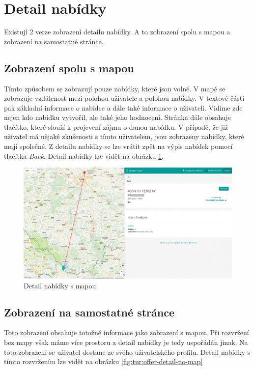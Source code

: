 \section{Detail nabídky}

\label{nur:detail}

Existují 2 verze zobrazení detailu nabídky. A to zobrazení spolu s mapou a zobrazení na samostatné stránce.

\subsection{Zobrazení spolu s mapou}
Tímto způsobem se zobrazují pouze nabídky, které jsou volné. V mapě se zobrazuje vzdálenost mezi polohou uživatele a polohou nabídky. V textové části pak základní informace o nabídce a dále také informace o uživateli. Vidíme zde nejen kdo nabídku vytvořil, ale také jeho hodnocení. Stránka dále obsahuje tlačítko, které slouží k projevení zájmu o danou nabídku. V případě, že již uživatel má nějaké zkušenosti s tímto uživatelem, jsou zobrazeny nabídky, které mají společné. Z detailu nabídky se lze vrátit zpět na výpis nabídek pomocí tlačítka \textit{Back}. Detail nabídky lze vidět na obrázku \ref{fig:tur:offer-detail-map}.

\begin{figure}[h]
    \centering
    \includegraphics[width=1.0\textwidth]{media/tur/offer-detail-map.png}
    \caption{Detail nabídky s mapou}
    \label{fig:tur:offer-detail-map}
\end{figure}

\subsection{Zobrazení na samostatné stránce}
Toto zobrazení obsahuje totožné informace jako zobrazení s mapou. Při rozvržení bez mapy však máme více prostoru a detail nabídky je tedy uspořádán jinak. Na toto zobrazení se uživatel dostane ze svého uživatelského profilu. Detail nabídky s tímto rozvržením lze vidět na obrázku \ref{fig:tur:offer-detail-no-map}

